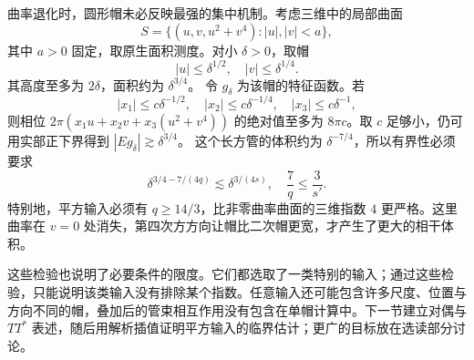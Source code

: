 曲率退化时，圆形帽未必反映最强的集中机制。考虑三维中的局部曲面
\[
 S=\{(u,v,u^2+v^4):|u|,|v|<a\},
\]
其中 \(a>0\) 固定，取原生面积测度。对小 \(\delta>0\)，取帽
\[
 |u|\leq\delta^{1/2},\quad |v|\leq\delta^{1/4}.
\]
其高度至多为 \(2\delta\)，面积约为 \(\delta^{3/4}\)。
令 \(g_\delta\) 为该帽的特征函数。若
\[
 |x_1|\leq c\delta^{-1/2},\quad
 |x_2|\leq c\delta^{-1/4},\quad
 |x_3|\leq c\delta^{-1},
\]
则相位 \(2\pi(x_1u+x_2v+x_3(u^2+v^4))\) 的绝对值至多为
\(8\pi c\)。取 \(c\) 足够小，仍可用实部正下界得到
\(|Eg_\delta|\gtrsim\delta^{3/4}\)。
这个长方管的体积约为 \(\delta^{-7/4}\)，所以有界性必须要求
\[
 \delta^{3/4-7/(4q)}
       \lesssim\delta^{3/(4s)},\quad
 \frac7q\leq\frac3{s'}.
\]
特别地，平方输入必须有 \(q\geq14/3\)，比非零曲率曲面的三维指数
\(4\) 更严格。这里曲率在 \(v=0\) 处消失，第四次方方向让帽比二次帽更宽，才产生了更大的相干体积。

\ProseParagraphBreak
这些检验也说明了必要条件的限度。它们都选取了一类特别的输入；通过这些检验，只能说明该类输入没有排除某个指数。任意输入还可能包含许多尺度、位置与方向不同的帽，叠加后的管束相互作用没有包含在单帽计算中。下一节建立对偶与 \(TT^*\) 表述，随后用解析插值证明平方输入的临界估计；更广的目标放在选读部分讨论。
